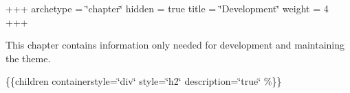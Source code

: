 +++ archetype = \char`\"{}chapter\char`\"{} hidden = true title = \char`\"{}\+Development\char`\"{} weight = 4 +++

This chapter contains information only needed for development and maintaining the theme.

\{\{children containerstyle=\char`\"{}div\char`\"{} style=\char`\"{}h2\char`\"{} description=\char`\"{}true\char`\"{} \%\}\} 
